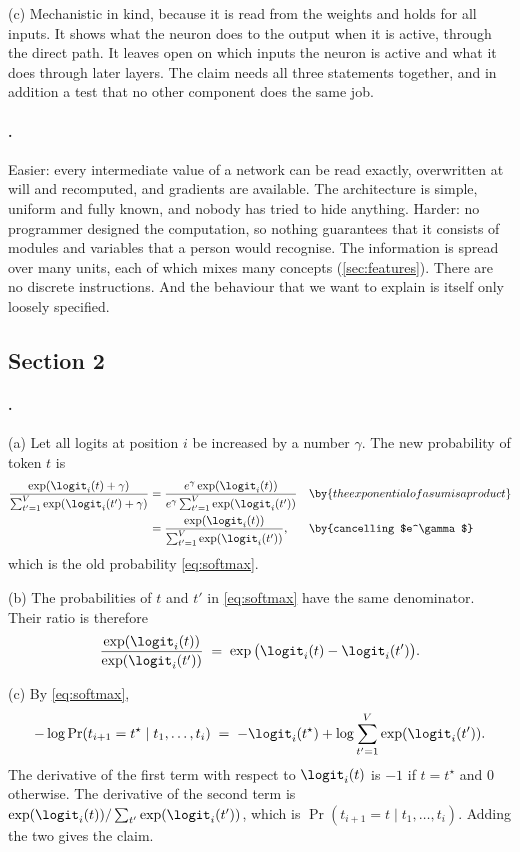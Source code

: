 {(c) Mechanistic in kind, because it is read from the weights and holds for all inputs. It shows what the neuron
does to the output when it is active, through the direct path. It leaves open on which inputs the neuron is active
and what it does through later layers.
The claim needs all three statements together, and in addition a test that no other component does the same job.

\paragraph{.}
Easier: every intermediate value of a network can be read exactly, overwritten at will and recomputed, and
gradients are available. The architecture is simple, uniform and fully known, and nobody has tried to hide
anything. Harder: no programmer designed the computation, so nothing guarantees that it consists of modules and
variables that a person would recognise. The information is spread over many units, each of which mixes many
concepts (\cref{sec:features}). There are no discrete instructions. And the behaviour that we want to explain is
itself only loosely specified.

\subsection*{Section 2}

\paragraph{.}
(a) Let all logits at position $i$ be increased by a number $\gamma$. The new probability of token $t$ is
\begin{align*}
\frac{\exp(\logit_i(t)+\gamma)}{\sum_{t'=1}^{V}\exp(\logit_i(t')+\gamma)}
&= \frac{e^{\gamma}\exp(\logit_i(t))}{e^{\gamma}\sum_{t'=1}^{V}\exp(\logit_i(t'))} && \by{the exponential of a sum is a product}\\
&= \frac{\exp(\logit_i(t))}{\sum_{t'=1}^{V}\exp(\logit_i(t'))}, && \by{cancelling $e^\gamma$}
\end{align*}
which is the old probability \eqref{eq:softmax}.

(b) The probabilities of $t$ and $t'$ in \eqref{eq:softmax} have the same denominator. Their ratio is therefore
\[
\frac{\exp(\logit_i(t))}{\exp(\logit_i(t'))} \;=\; \exp\big(\logit_i(t)-\logit_i(t')\big).
\]

(c) By \eqref{eq:softmax},
\[
-\log\Pr(t_{i+1}=t^\star\mid t_1,\dots,t_i) \;=\; -\logit_i(t^\star)+\log\sum_{t'=1}^{V}\exp(\logit_i(t')).
\]
The derivative of the first term with respect to $\logit_i(t)$ is $-1$ if $t=t^\star$ and $0$ otherwise. The
derivative of the second term is $\exp(\logit_i(t))/\sum_{t'}\exp(\logit_i(t'))$, which is
$\Pr(t_{i+1}=t\mid t_1,\dots,t_i)$. Adding the two gives the claim.

}
